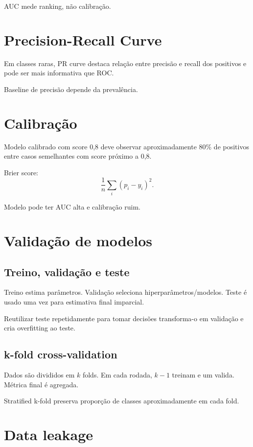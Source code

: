 AUC mede ranking, não calibração.

\section{Precision-Recall Curve}

Em classes raras, PR curve destaca relação entre precisão e recall dos positivos e pode ser mais informativa que ROC.

Baseline de precisão depende da prevalência.

\section{Calibração}

Modelo calibrado com score 0,8 deve observar aproximadamente 80\% de positivos entre casos semelhantes com score próximo a 0,8.

Brier score:
\[
\frac{1}{n}\sum_i(p_i-y_i)^2.
\]

Modelo pode ter AUC alta e calibração ruim.

\section{Validação de modelos}

\subsection{Treino, validação e teste}

Treino estima parâmetros. Validação seleciona hiperparâmetros/modelos. Teste é usado uma vez para estimativa final imparcial.

Reutilizar teste repetidamente para tomar decisões transforma-o em validação e cria overfitting ao teste.

\subsection{k-fold cross-validation}

Dados são divididos em $k$ folds. Em cada rodada, $k-1$ treinam e um valida. Métrica final é agregada.

Stratified k-fold preserva proporção de classes aproximadamente em cada fold.

\section{Data leakage}


